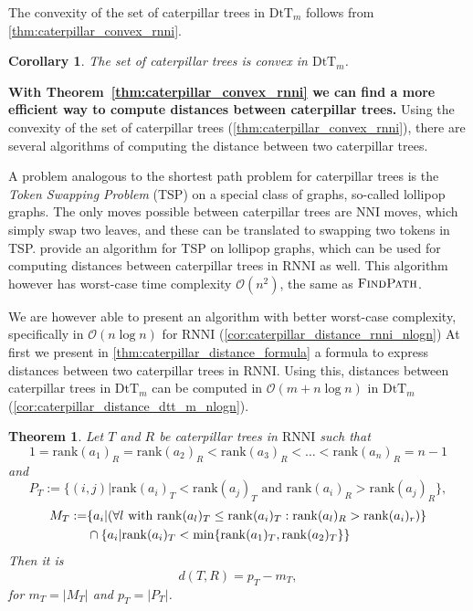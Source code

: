 \documentclass[11pt]{amsart}
\newtheorem{theorem}{Theorem}
\newtheorem{corollary}{Corollary}
\newcommand{\rnni}{\mathrm{RNNI}}
\newcommand{\findpath}{\textsc{FindPath}}
\newcommand{\rank}{\mathrm{rank}}
\newcommand{\nni}{\mathrm{NNI}}
\newcommand{\dtt}{\mathrm{DtT}}
\renewcommand{\O}{\mathcal O}
\newcommand{\summary}[1]{\textbf{#1}} %
\begin{document}
The convexity of the set of caterpillar trees in $\dtt_m$ follows from \autoref{thm:caterpillar_convex_rnni}.

\begin{corollary}
	The set of caterpillar trees is convex in $\dtt_m$.
	\label{cor:caterpillar_convex_dtt}
\end{corollary}

\summary{With Theorem~\ref{thm:caterpillar_convex_rnni} we can find a more efficient way to compute distances between caterpillar trees.}
Using the convexity of the set of caterpillar trees (\autoref{thm:caterpillar_convex_rnni}), there are several algorithms of computing the distance between two caterpillar trees.

A problem analogous to the shortest path problem for caterpillar trees is the \emph{Token Swapping Problem} (TSP) \autocite{Kawahara2017-ey} on a special class of graphs, so-called lollipop graphs.
The only moves possible between caterpillar trees are $\nni$ moves, which simply swap two leaves, and these can be translated to swapping two tokens in TSP.
\textcite{Kawahara2017-ey} provide an algorithm for TSP on lollipop graphs, which can be used for computing distances between caterpillar trees in $\rnni$ as well.
This algorithm however has worst-case time complexity $\O(n^2)$, the same as $\findpath$.

We are however able to present an algorithm with better worst-case complexity, specifically in $\O(n \log n)$ for $\rnni$ (\autoref{cor:caterpillar_distance_rnni_nlogn})
At first we present in \autoref{thm:caterpillar_distance_formula} a formula to express distances between two caterpillar trees in $\rnni$.
Using this, distances between caterpillar trees in $\dtt_m$ can be computed in $\O(m + n \log n)$ in $\dtt_m$ (\autoref{cor:caterpillar_distance_dtt_m_nlogn}).

\begin{theorem}
	Let $T$ and $R$ be caterpillar trees in $\rnni$ such that \[1 = \rank(a_1)_R = \rank(a_2)_R < \rank(a_3)_R < \ldots < \rank(a_n)_R = n-1\]
	and
	\[P_T := \{(i,j)| \rank(a_i)_T < \rank(a_j)_T \text{ and } \rank(a_i)_R > \rank(a_j)_R\},\]
	\begin{align*}
		M_T := &\{a_i| (\forall l \textnormal{ with } \rank(a_l)_T \leq \rank(a_i)_T: \rank(a_l)_R > \rank(a_i)_r)\} \\
		& \cap \{a_i | \rank(a_i)_T < \min\{\rank(a_1)_T, \rank(a_2)_T\}\}
	\end{align*}
	Then it is
	\[d(T,R) = p_T - m_T,\]
	for ${m_T = |M_T|}$ and ${p_T = |P_T|}$.
	\label{thm:caterpillar_distance_formula}
\end{theorem}
\end{document}
